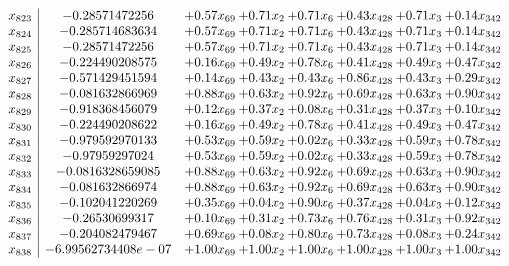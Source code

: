 \documentclass[8pt]{article}
\begin{document}
\[\begin{array}{c| c c@{\hskip 2pt} c@{\hskip 2pt} c@{\hskip 2pt} c@{\hskip 2pt} c@{\hskip 2pt} c@{\hskip 2pt} }
 x_{823}   &  -0.28571472256 & +  0.57 x_{69} & +  0.71 x_{2} & +  0.71 x_{6} & +  0.43 x_{428} & +  0.71 x_{3} & +  0.14 x_{342}\\
 x_{824}   &  -0.285714683634 & +  0.57 x_{69} & +  0.71 x_{2} & +  0.71 x_{6} & +  0.43 x_{428} & +  0.71 x_{3} & +  0.14 x_{342}\\
 x_{825}   &  -0.28571472256 & +  0.57 x_{69} & +  0.71 x_{2} & +  0.71 x_{6} & +  0.43 x_{428} & +  0.71 x_{3} & +  0.14 x_{342}\\
 x_{826}   &  -0.224490208575 & +  0.16 x_{69} & +  0.49 x_{2} & +  0.78 x_{6} & +  0.41 x_{428} & +  0.49 x_{3} & +  0.47 x_{342}\\
 x_{827}   &  -0.571429451594 & +  0.14 x_{69} & +  0.43 x_{2} & +  0.43 x_{6} & +  0.86 x_{428} & +  0.43 x_{3} & +  0.29 x_{342}\\
 x_{828}   &  -0.081632866969 & +  0.88 x_{69} & +  0.63 x_{2} & +  0.92 x_{6} & +  0.69 x_{428} & +  0.63 x_{3} & +  0.90 x_{342}\\
 x_{829}   &  -0.918368456079 & +  0.12 x_{69} & +  0.37 x_{2} & +  0.08 x_{6} & +  0.31 x_{428} & +  0.37 x_{3} & +  0.10 x_{342}\\
 x_{830}   &  -0.224490208622 & +  0.16 x_{69} & +  0.49 x_{2} & +  0.78 x_{6} & +  0.41 x_{428} & +  0.49 x_{3} & +  0.47 x_{342}\\
 x_{831}   &  -0.979592970133 & +  0.53 x_{69} & +  0.59 x_{2} & +  0.02 x_{6} & +  0.33 x_{428} & +  0.59 x_{3} & +  0.78 x_{342}\\
 x_{832}   &  -0.97959297024 & +  0.53 x_{69} & +  0.59 x_{2} & +  0.02 x_{6} & +  0.33 x_{428} & +  0.59 x_{3} & +  0.78 x_{342}\\
 x_{833}   &  -0.0816328659085 & +  0.88 x_{69} & +  0.63 x_{2} & +  0.92 x_{6} & +  0.69 x_{428} & +  0.63 x_{3} & +  0.90 x_{342}\\
 x_{834}   &  -0.081632866974 & +  0.88 x_{69} & +  0.63 x_{2} & +  0.92 x_{6} & +  0.69 x_{428} & +  0.63 x_{3} & +  0.90 x_{342}\\
 x_{835}   &  -0.102041220269 & +  0.35 x_{69} & +  0.04 x_{2} & +  0.90 x_{6} & +  0.37 x_{428} & +  0.04 x_{3} & +  0.12 x_{342}\\
 x_{836}   &  -0.26530699317 & +  0.10 x_{69} & +  0.31 x_{2} & +  0.73 x_{6} & +  0.76 x_{428} & +  0.31 x_{3} & +  0.92 x_{342}\\
 x_{837}   &  -0.204082479467 & +  0.69 x_{69} & +  0.08 x_{2} & +  0.80 x_{6} & +  0.73 x_{428} & +  0.08 x_{3} & +  0.24 x_{342}\\
 x_{838}   &  -6.99562734408e-07 & +  1.00 x_{69} & +  1.00 x_{2} & +  1.00 x_{6} & +  1.00 x_{428} & +  1.00 x_{3} & +  1.00 x_{342}\\

\end{array}\]
\end{document}
